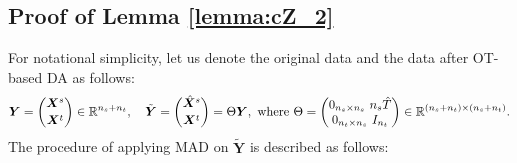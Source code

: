 \subsection{Proof of Lemma \ref{lemma:cZ_2}} \label{appx:proof_lemma_cZ_2}

For notational simplicity, let us denote the original data and the data after OT-based DA as follows:
%
\begin{align*}
	\bm Y = { \bm X^s \choose \bm X^t } \in \mathbb{R}^{n_s + n_t}, 
	\quad 
	\tilde{\bm Y} = { \hat{\bm X}^s \choose \bm X^t } = \Theta \bm Y, 
	\text{ where }
	\Theta = 
	\begin{pmatrix}
		0_{n_s \times n_s} ~ n_s \hat{T} \\ 
		0_{n_t \times n_s} ~ I_{n_t}
	\end{pmatrix}
	\in \mathbb{R}^{(n_s + n_t) \times (n_s + n_t)}.
\end{align*}
%
The procedure of applying MAD on $\tilde{\bm Y}$ is described as follows:

